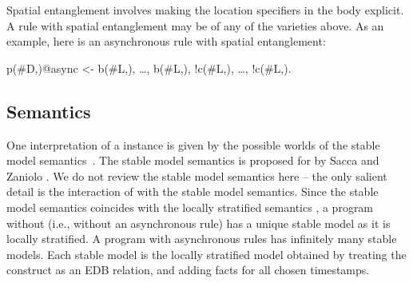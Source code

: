 
Spatial entanglement involves making the location specifiers in the body explicit.  A rule with spatial entanglement may be of any of the varieties above.  As an example, here is an asynchronous rule with spatial entanglement:

\begin{Dedalus}
p(#D,)@async <- b(#L,), \ldots, b(#L,),
!c(#L,), \ldots, !c(#L,).
\end{Dedalus}




\subsection{Semantics}
One interpretation of a \lang instance is given by the possible worlds of the
stable model semantics~\cite{stable-model}.  The stable model semantics is proposed for  by Sacca and Zaniolo .
We do not review the stable model
semantics here -- the only salient detail is the interaction of 
with the stable model semantics.  Since the stable model semantics coincides with the locally stratified semantics , a \lang program without  (i.e., without an asynchronous rule) has a unique stable model as it is locally stratified.  A \lang program with asynchronous rules has infinitely many stable models.  Each stable model is the locally stratified model obtained by treating the  construct as an EDB relation, and adding facts for all chosen timestamps.

